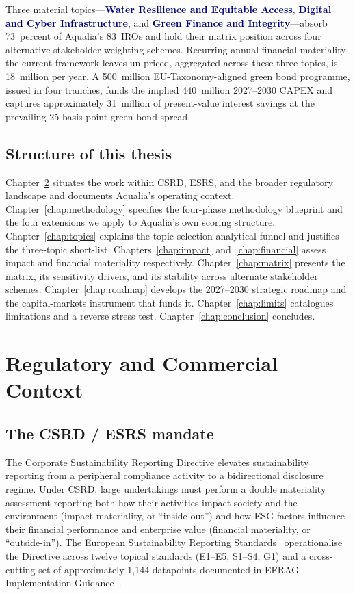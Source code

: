 \documentclass[11pt, a4paper, twoside, openright]{scrreprt}
\newcommand{\euro}{\texteuro}
\newcommand{\signalword}[1]{\textbf{\textcolor{navy}{#1}}}
\begin{document}
Three material topics---\signalword{Water Resilience and Equitable Access}, \signalword{Digital and Cyber Infrastructure}, and \signalword{Green Finance and Integrity}---absorb 73~percent of Aqualia's 83~IROs and hold their matrix position across four alternative stakeholder-weighting schemes. Recurring annual financial materiality the current framework leaves un-priced, aggregated across these three topics, is \euro{}18~million per year. A \euro{}500~million EU-Taxonomy-aligned green bond programme, issued in four tranches, funds the implied \euro{}440~million 2027--2030 CAPEX and captures approximately \euro{}31~million of present-value interest savings at the prevailing 25 basis-point green-bond spread.

\section{Structure of this thesis}

Chapter~\ref{chap:context} situates the work within CSRD, ESRS, and the broader regulatory landscape and documents Aqualia's operating context. Chapter~\ref{chap:methodology} specifies the four-phase methodology blueprint and the four extensions we apply to Aqualia's own scoring structure. Chapter~\ref{chap:topics} explains the topic-selection analytical funnel and justifies the three-topic short-list. Chapters~\ref{chap:impact} and~\ref{chap:financial} assess impact and financial materiality respectively. Chapter~\ref{chap:matrix} presents the matrix, its sensitivity drivers, and its stability across alternate stakeholder schemes. Chapter~\ref{chap:roadmap} develops the 2027--2030 strategic roadmap and the capital-markets instrument that funds it. Chapter~\ref{chap:limits} catalogues limitations and a reverse stress test. Chapter~\ref{chap:conclusion} concludes.

\chapter{Regulatory and Commercial Context}
\label{chap:context}

\section{The CSRD / ESRS mandate}

The Corporate Sustainability Reporting Directive elevates sustainability reporting from a peripheral compliance activity to a bidirectional disclosure regime. Under CSRD, large undertakings must perform a double materiality assessment reporting both how their activities impact society and the environment (impact materiality, or ``inside-out'') and how ESG factors influence their financial performance and enterprise value (financial materiality, or ``outside-in''). The European Sustainability Reporting Standards~\cite{esrs2023} operationalise the Directive across twelve topical standards (E1--E5, S1--S4, G1) and a cross-cutting set of approximately 1{,}144 datapoints documented in EFRAG Implementation Guidance~\cite{efrag2024}.
\end{document}

